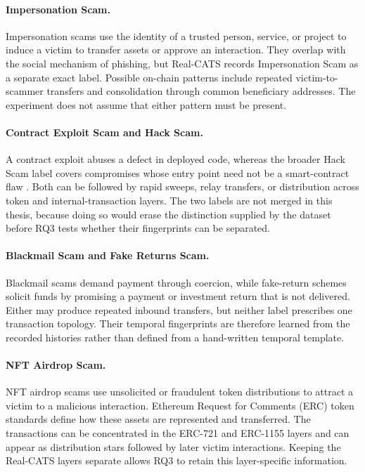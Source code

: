 \documentclass{thesisclass}
\begin{document}
\paragraph{Impersonation Scam.}
Impersonation scams use the identity of a trusted person, service, or project to
induce a victim to transfer assets or approve an interaction. They overlap with
the social mechanism of phishing, but Real-CATS records Impersonation Scam as a
separate exact label. Possible on-chain patterns include repeated victim-to-scammer
transfers and consolidation through common beneficiary addresses. The experiment
does not assume that either pattern must be present.

\paragraph{Contract Exploit Scam and Hack Scam.}
A contract exploit abuses a defect in deployed code, whereas the broader Hack Scam
label covers compromises whose entry point need not be a smart-contract flaw
\citep{shi2025realcats}. Both can be followed by rapid sweeps, relay transfers, or
distribution across token and internal-transaction layers. The two labels are not
merged in this thesis, because doing so would erase the distinction supplied by the
dataset before RQ3 tests whether their fingerprints can be separated.

\paragraph{Blackmail Scam and Fake Returns Scam.}
Blackmail scams demand payment through coercion, while fake-return schemes solicit
funds by promising a payment or investment return that is not delivered. Either may
produce repeated inbound transfers, but neither label prescribes one transaction
topology. Their temporal fingerprints are therefore learned from the recorded
histories rather than defined from a hand-written temporal template.

\paragraph{NFT Airdrop Scam.}
NFT airdrop scams use unsolicited or fraudulent token distributions to attract a
victim to a malicious interaction. Ethereum Request for Comments (ERC) token
standards define how these assets are represented and transferred. The
transactions can be concentrated in the ERC-721 and ERC-1155 layers and can
appear as distribution stars followed by later
victim interactions. Keeping the Real-CATS layers separate allows RQ3 to retain
this layer-specific information.
\end{document}
